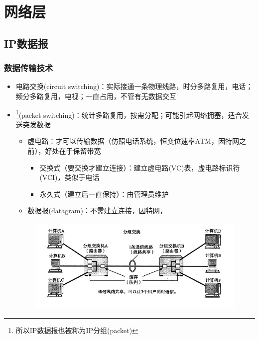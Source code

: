 
\section{网络层}
\subsection{IP数据报}
\subsubsection{数据传输技术}
\begin{itemize}
\item 电路交换(circuit switching)：实际接通一条物理线路，时分多路复用，电话；频分多路复用，电视；一直占用，不管有无数据交互
\item {}\footnote{所以IP数据报也被称为IP分组(packet)}(packet switching)：统计多路复用，按需分配；可能引起网络拥塞，适合发送突发数据
\begin{itemize}
	\item 虚电路：才可以传输数据（仿照电话系统，恒变位速率ATM，因特网之前），好处在于保留带宽
	\begin{itemize}
	    \item 交换式（要交换才建立连接）：建立虚电路(VC)表，虚电路标识符(VCI)，类似于电话
	    \item 永久式（建立后一直保持）：由管理员维护
	\end{itemize}
	\item 数据报(datagram)：不需建立连接，因特网，
\end{itemize}
\begin{figure}[H]
	\centering
	\includegraphics[width=0.6\linewidth]{fig/ip-packet.png}
\end{figure}
\end{itemize}

